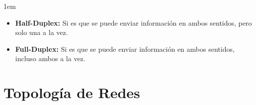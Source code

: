 \documentclass[12pt, fleqn]{report}                             %
\newenvironment{SmallIndentation}[1][0.75em]                    %
        {\begin{adjustwidth}{#1}{}\begin{footnotesize}}             %
        {\end{footnotesize}\end{adjustwidth}}                       %
\theoremstyle{break}                                            %
\begin{document}
\begin{SmallIndentation}[1em]
\begin{itemize}
                    \item \textbf{Half-Duplex:}
                        Si es que se puede enviar información en ambos sentidos, pero
                        solo una a la vez.

                    \item \textbf{Full-Duplex:}
                        Si es que se puede enviar información en ambos sentidos, incluso
                        ambos a la vez.

                \end{itemize}

        \end{SmallIndentation}



        \clearpage
        \section{Topología de Redes}
\end{document}
